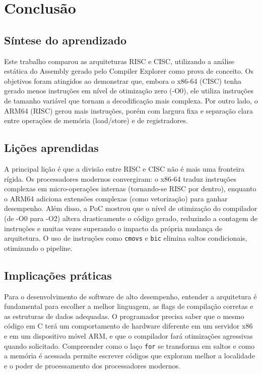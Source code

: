 \chapter{Conclusão}
\label{cap:conclusao}

\section{Síntese do aprendizado}
Este trabalho comparou as arquiteturas RISC e CISC, utilizando a análise estática do Assembly gerado pelo Compiler Explorer como prova de conceito. Os objetivos foram atingidos ao demonstrar que, embora o x86-64 (CISC) tenha gerado menos instruções em nível de otimização zero (-O0), ele utiliza instruções de tamanho variável que tornam a decodificação mais complexa. Por outro lado, o ARM64 (RISC) gerou mais instruções, porém com largura fixa e separação clara entre operações de memória (load/store) e de registradores.

\section{Lições aprendidas}
A principal lição é que a divisão entre RISC e CISC não é mais uma fronteira rígida. Os processadores modernos convergiram: o x86-64 traduz instruções complexas em micro-operações internas (tornando-se RISC por dentro), enquanto o ARM64 adiciona extensões complexas (como vetorização) para ganhar desempenho. Além disso, a PoC mostrou que o nível de otimização do compilador (de -O0 para -O2) altera drasticamente o código gerado, reduzindo a contagem de instruções e muitas vezes superando o impacto da própria mudança de arquitetura. O uso de instruções como \texttt{cmovs} e \texttt{bic} elimina saltos condicionais, otimizando o pipeline.

\section{Implicações práticas}
Para o desenvolvimento de software de alto desempenho, entender a arquitetura é fundamental para escolher a melhor linguagem, as flags de compilação corretas e as estruturas de dados adequadas. O programador precisa saber que o mesmo código em C terá um comportamento de hardware diferente em um servidor x86 e em um dispositivo móvel ARM, e que o compilador fará otimizações agressivas quando solicitado. Compreender como o laço \texttt{for} se transforma em saltos e como a memória é acessada permite escrever códigos que exploram melhor a localidade e o poder de processamento dos processadores modernos.